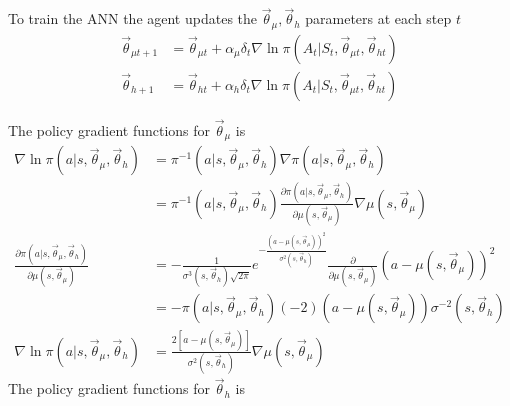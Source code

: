 \documentclass[]{article}
\begin{document}
To train the ANN the agent updates the $ \vec \theta_\mu, \vec \theta_h $ parameters at each step $ t $
\begin{align}
	\vec \theta_{\mu t+1}
	&= \vec \theta_{\mu t}
	+ \alpha_\mu \delta_t \nabla \ln \pi(A_t|S_t, \vec \theta_{\mu t}, \vec \theta_{h t})
	\\
	\vec \theta_{h+1}
	&= \vec \theta_{h t}
	+ \alpha_h \delta_t \nabla \ln \pi(A_t|S_t, \vec \theta_{\mu t}, \vec \theta_{h t})
\end{align}

The policy gradient functions for $\vec \theta_\mu $ is
\begin{align*}
	\nabla \ln \pi(a|s,\vec \theta_\mu, \vec \theta_h)
	& = \pi^{-1}(a|s,\vec \theta_\mu, \vec \theta_h) \nabla \pi(a|s,\vec \theta_\mu, \vec \theta_h)
	\\
	& = \pi^{-1}(a|s,\vec \theta_\mu, \vec \theta_h) \frac{\partial \pi(a|s,\vec \theta_\mu, \vec \theta_h)}{\partial \mu(s, \vec \theta_\mu)} \nabla \mu(s, \vec \theta_\mu)
	\\
	\frac{\partial \pi(a|s,\vec \theta_\mu, \vec \theta_h)}{\partial \mu(s, \vec \theta_\mu)}
	& = - \frac{1}{\sigma^3(s, \vec \theta_h) \sqrt{2 \pi} } e^{-\frac{(a-\mu(s, \vec \theta_\mu))^2}{\sigma^2(s, \vec \theta_h)}} \frac{\partial }{\partial \mu(s,\vec \theta_\mu)} (a-\mu(s, \vec \theta_\mu))^2
	\\
	& = -\pi(a|s,\vec \theta_\mu, \vec \theta_h)  (-2) (a - \mu(s, \vec \theta_\mu)) \sigma^{-2}(s, \vec \theta_h)
	\\
	\nabla \ln \pi(a|s,\vec \theta_\mu, \vec \theta_h)
	& = \frac{2 [a - \mu(s, \vec \theta_\mu)]}{\sigma^2(s, \vec \theta_h)} \nabla \mu(s, \vec \theta_\mu)
\end{align*}
The policy gradient functions for $\vec \theta_h $ is
\end{document}
